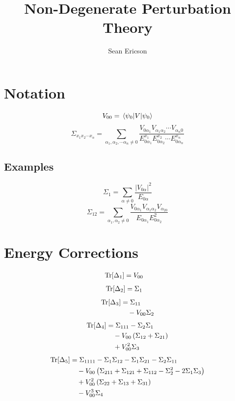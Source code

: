 \documentclass[12pt]{article}
\newcommand{\magsq}[1]{\big|#1\big|^2}
\newcommand{\trdelta}[1]{\Tr[\Delta_{#1}]}
\begin{document}
	
\title{Non-Degenerate Perturbation Theory}
\author{Sean Ericson}
\maketitle

\section*{Notation}
\[ V_{00} = \mel{\psi_0}{V}{\psi_0} \]
\[ \Sigma_{x_1x_2\cdots x_n} = \sum_{\alpha_1,\alpha_2,\cdots \alpha_n\neq 0} \frac{V_{0\alpha_1}V_{\alpha_1\alpha_2}\cdots V_{\alpha_n0}}{E_{0\alpha_1}^{x_1}E_{0\alpha_2}^{x_2}\cdots E_{0\alpha_n}^{x_n}} \]
\subsection*{Examples}
\[ \Sigma_1 = \sum_{\alpha\neq 0}\frac{\magsq{V_{0\alpha}}}{E_{0\alpha}} \]
\[ \Sigma_{12} = \sum_{\alpha_1,\alpha_2\neq 0}\frac{V_{0\alpha_1}V_{\alpha_1\alpha_2}V_{\alpha_20}}{E_{0\alpha_1}E_{0\alpha_2}^2} \]

\section*{Energy Corrections}
\begin{align*}
    \trdelta{1} &= V_{00}
\end{align*}
\begin{align*}
    \trdelta{2} &= \Sigma_1
\end{align*}
\begin{align*}
    \trdelta{3} &= \Sigma_{11} \\
    &\quad - V_{00}\Sigma_2
\end{align*}
\begin{align*}
    \trdelta{4} &= \Sigma_{111} - \Sigma_2\Sigma_1 \\
    &\quad - V_{00}\left(\Sigma_{12} + \Sigma_{21}\right) \\
    &\quad + V_{00}^2\Sigma_3
\end{align*}
\begin{align*}
    \trdelta{5} &= \Sigma_{1111} - \Sigma_1\Sigma_{12} - \Sigma_1\Sigma_{21} - \Sigma_2\Sigma_{11} \\
    &\quad - V_{00}\left(\Sigma_{211} + \Sigma_{121} + \Sigma_{112} - \Sigma_2^2 - 2\Sigma_1\Sigma_3\right) \\
    &\quad + V_{00}^2\left(\Sigma_{22} + \Sigma_{13} + \Sigma_{31}\right) \\
    &\quad - V_{00}^3\Sigma_4
\end{align*}
\end{document}
